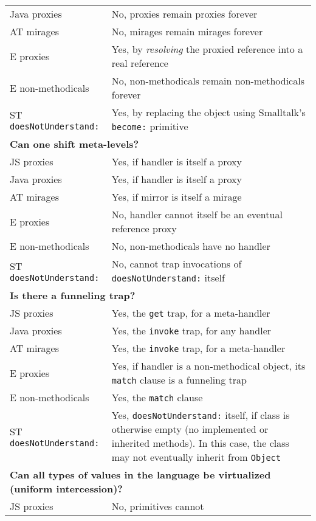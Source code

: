 \documentclass{acm_proc_article-sp}
\begin{document}
\begin{table*}
\begin{tabular}{|p{}|p{}|}
    Java proxies      & No, proxies remain proxies forever\\
    AT mirages        & No, mirages remain mirages forever\\
    E proxies         & Yes, by \emph{resolving} the proxied reference into a real reference\\
    E non-methodicals & No, non-methodicals remain non-methodicals forever\\
    ST \texttt{doesNotUnderstand:}  & Yes, by replacing the object using Smalltalk's \texttt{become:} primitive\\
    \hline
    \multicolumn{2}{|l|}{\textbf{Can one shift meta-levels?}}\\
    \hline
    JS proxies        & Yes, if handler is itself a proxy\\
    Java proxies      & Yes, if handler is itself a proxy\\
    AT mirages        & Yes, if mirror is itself a mirage\\
    E proxies         & No, handler cannot itself be an eventual reference proxy\\
    E non-methodicals & No, non-methodicals have no handler\\
    ST \texttt{doesNotUnderstand:}  & No, cannot trap invocations of \texttt{doesNotUnderstand:} itself\\
    \hline
    \multicolumn{2}{|l|}{\textbf{Is there a funneling trap?}}\\
    \hline
    JS proxies        & Yes, the \texttt{get} trap, for a meta-handler\\
    Java proxies      & Yes, the \texttt{invoke} trap, for any handler\\
    AT mirages        & Yes, the \texttt{invoke} trap, for a meta-handler\\
    E proxies         & Yes, if handler is a non-methodical object, its \texttt{match} clause is a funneling trap\\
    E non-methodicals & Yes, the \texttt{match} clause\\
    ST \texttt{doesNotUnderstand:}  & Yes, \texttt{doesNotUnderstand:} itself, if class is otherwise empty (no implemented or inherited methods). In this case, the class may not eventually inherit from \texttt{Object}\\
    \hline
    \multicolumn{2}{|l|}{\textbf{Can all types of values in the language be virtualized (uniform intercession)?}}\\
    \hline
    JS proxies        & No, primitives cannot\\

\end{tabular}
\end{table*}
\end{document}
